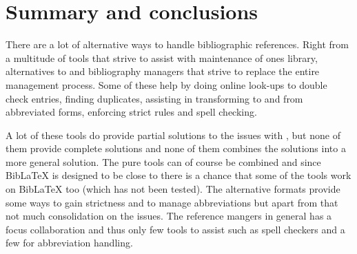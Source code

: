 







\section{Summary and conclusions}
There are a lot of alternative ways to handle
bibliographic references.  Right from a multitude of tools that strive
to assist with maintenance of ones {\bibtex} library, alternatives to
{\bibtex} and bibliography managers that strive to replace the entire
management process.  Some of these help by doing online look-ups to
double check entries, finding duplicates, assisting in transforming to
and from abbreviated forms, enforcing strict rules and spell checking.

A lot of these tools do provide partial solutions to the issues with
{\bibtex}, but none of them provide complete solutions and none of
them combines the solutions into a more general solution.  The pure
{\bibtex} tools can of course be combined and since Bib{\LaTeX} is
designed to be close to {\bibtex} there is a chance that some of the
{\bibtex} tools work on Bib{\LaTeX} too (which has not been tested).  The
alternative formats provide some ways to gain strictness and to manage
abbreviations but apart from that not much consolidation on the
issues.  The reference mangers in general has a focus collaboration
and thus only few tools to assist such as spell checkers and a few for
abbreviation handling.


